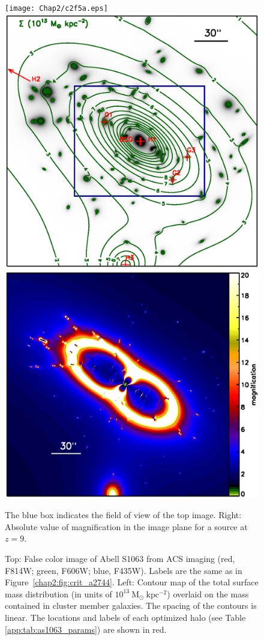 \begin{figure}[h]
\centering
\texttt{[image: Chap2/c2f5a.eps]} \\
\includegraphics[height=0.28\textheight]{Chap2/c2f5b.eps}
\includegraphics[height=0.28\textheight]{Chap2/c2f5c.eps}
\caption[Abell S1063 image constraints and critical curves]{Top: False color image of Abell S1063 from ACS imaging (red, F814W; green, F606W; blue, F435W).  Labels are the same as in Figure~\ref{chap2:fig:crit_a2744}. Left: Contour map of the total surface mass distribution (in units of $10^{13}\ \mathrm{M_\odot \ kpc^{-2}}$) overlaid on the mass contained in cluster member galaxies. The spacing of the contours is linear. The locations and labels of each optimized halo (see Table \ref{app:tab:as1063_params}) are shown in red.} The blue box indicates the field of view of the top image. Right: Absolute value of magnification in the image plane for a source at $z=9$.
\label{chap2:fig:crit_as1063}
\end{figure}

